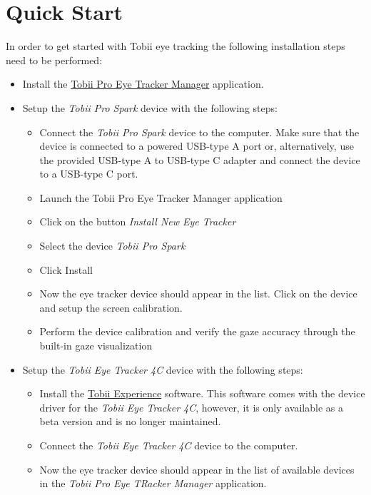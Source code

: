 \documentclass[a4paper,oneside]{book}
\begin{document}
\chapter{Quick Start}
\label{sec.quick}
In order to get started with Tobii eye tracking the following installation steps need to be performed:
\begin{itemize}
    \item Install the \href{https://www.tobii.com/products/software/applications-and-developer-kits/tobii-pro-eye-tracker-manager}{Tobii Pro Eye Tracker Manager} application.
    \item Setup the \emph{Tobii Pro Spark} device with the following steps:
        \begin{itemize}
            \item Connect the \emph{Tobii Pro Spark} device to the computer.
                Make sure that the device is connected to a powered USB-type A port or, alternatively, use the provided USB-type A to USB-type C adapter and connect the device to a USB-type C port.
            \item Launch the Tobii Pro Eye Tracker Manager application
            \item Click on the button \emph{Install New Eye Tracker}
            \item Select the device \emph{Tobii Pro Spark}
            \item Click Install
            \item Now the eye tracker device should appear in the list.
                Click on the device and setup the screen calibration.
            \item Perform the device calibration and verify the gaze accuracy through the built-in gaze visualization
        \end{itemize}
    \item Setup the \emph{Tobii Eye Tracker 4C} device with the following steps:
        \begin{itemize}
            \item Install the \href{https://files.update.tech.tobii.com/Tobii.IS4C.Offline.Installer_4.124.0.15937.msi}{Tobii Experience} software.
                This software comes with the device driver for the \emph{Tobii Eye Tracker 4C}, however, it is only available as a beta version and is no longer maintained.
            \item Connect the \emph{Tobii Eye Tracker 4C} device to the computer.
            \item Now the eye tracker device should appear in the list of available devices in the \emph{Tobii Pro Eye TRacker Manager} application.

\end{itemize}
\end{itemize}
\end{document}
